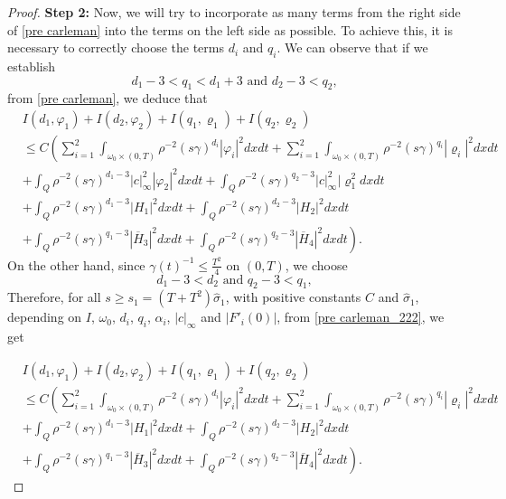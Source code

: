 \documentclass[11pt,a4paper]{amsart}
\numberwithin{equation}{section}
\begin{document}
\begin{proof}
\textbf{Step 2:} Now, we will try to incorporate as many terms from the right side of \eqref{pre carleman} into the terms on the left side as possible. To achieve this, it is necessary to correctly choose the terms $d_i$ and  $q_i$. We can observe that if we establish
\begin{equation*}
    d_1-3<q_1<d_1+3\text{ and }d_2-3<q_2,
\end{equation*}from \eqref{pre carleman}, we deduce that
\begin{equation}\label{pre carleman_222}
\begin{split}
  &I(d_1,\varphi_1) +I(d_2,\varphi_2)+I(q_1,\varrho_1)+I(q_2,\varrho_2)\\
    &\leq C\left( \sum_{i=1}^2 \int_{\omega_0 \times (0,T)} \rho^{-2}(s\gamma)^{d_i}|\varphi_i|^2 dxdt +\sum_{i=1}^2 \int_{\omega_0 \times (0,T)} \rho^{-2}(s\gamma)^{q_i}|\varrho_i|^2 dxdt \right.\\
    & +\int_Q\rho^{-2}(s\gamma)^{d_1-3} |c|^2_\infty |\varphi_2|^2dxdt + \int_Q\rho^{-2}(s\gamma)^{q_2-3} |c|^2_\infty |\varrho_1^2dxdt \\
  &+\int_Q\rho^{-2}(s\gamma)^{d_1-3} \vert H_1\vert^2  dxdt +\int_Q\rho^{-2}(s\gamma)^{d_2-3} \vert H_2\vert^2  dxdt \\
  &\left. +\int_Q\rho^{-2}(s\gamma)^{q_1-3} |\overline{H}_3|^2  dxdt +\int_Q\rho^{-2}(s\gamma)^{q_2-3} |\overline{H}_4|^2  dxdt \right).  
\end{split}
\end{equation}On the other hand, since $\gamma(t)^{-1} \leq \frac{T^2}{4}$ on $(0,T)$, we choose
\begin{equation*}
    d_1-3<d_2 \text{ and } q_2-3<q_1,
\end{equation*} Therefore, for all $ s\geq s_1=(T+T^{2})\hat{\sigma}_{1}$, with positive constants $C$ and $\hat{\sigma}_1$,  depending on $I$, $\omega_0$, $d_i$, $q_i$, $\alpha_i$, $|c|_\infty$ and  $|F'_i(0)|$, from \eqref{pre carleman_222}, we get

\begin{equation}\label{rett}
\begin{split}
  &I(d_1,\varphi_1) +I(d_2,\varphi_2)+I(q_1,\varrho_1)+I(q_2,\varrho_2)\\
    &\leq C\left( \sum_{i=1}^2 \int_{\omega_0 \times (0,T)} \rho^{-2}(s\gamma)^{d_i}|\varphi_i|^2 dxdt +\sum_{i=1}^2 \int_{\omega_0 \times (0,T)} \rho^{-2}(s\gamma)^{q_i}|\varrho_i|^2 dxdt \right.\\
  &+\int_Q\rho^{-2}(s\gamma)^{d_1-3} \vert H_1\vert^2  dxdt +\int_Q\rho^{-2}(s\gamma)^{d_2-3} \vert H_2\vert^2  dxdt \\
  &\left. +\int_Q\rho^{-2}(s\gamma)^{q_1-3} |\overline{H}_3|^2  dxdt +\int_Q\rho^{-2}(s\gamma)^{q_2-3} |\overline{H}_4|^2  dxdt \right).  
\end{split}
\end{equation}


\end{proof}
\end{document}
